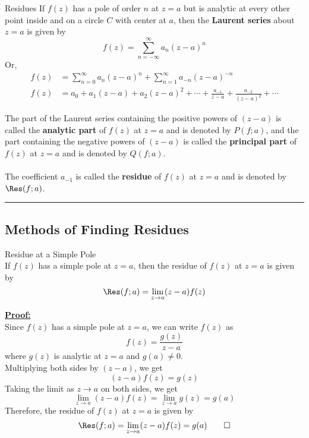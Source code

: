 \begin{definition}{Residues}{}
    If $f(z)$ has a pole of order $n$ at $z=a$ but is analytic at every other point inside and on a circle $C$ with center at $a$, then the \textbf{Laurent series} about $z=a$ is given by
    \begin{equation}
        f(z) = \sum_{n=-\infty}^{\infty} a_n (z-a)^n
    \end{equation} Or,
    \begin{align*}
        f(z) &= \sum_{n=0}^{\infty} a_n (z-a)^n + \sum_{n=1}^{\infty} a_{-n} (z-a)^{-n} \\
        f(z) &= a_0 + a_1(z-a) + a_2(z-a)^2 + \cdots + \frac{a_{-1}}{z-a} + \frac{a_{-2}}{(z-a)^2} + \cdots
    \end{align*}

    The part of the Laurent series containing the positive powers of $(z-a)$ is called the \textbf{analytic part} of $f(z)$ at $z=a$ and is denoted by $P(f;a)$, and the part containing the negative powers of $(z-a)$ is called the \textbf{principal part} of $f(z)$ at $z=a$ and is denoted by $Q(f;a)$.  \\~\\

    The coefficient $a_{-1}$ is called the \textbf{residue} of $f(z)$ at $z=a$ and is denoted by $\Res(f;a)$.
\end{definition}

\vspace{20pt}\rule{3in}{1pt}

\subsection{Methods of Finding Residues}
\begin{theorem}{Residue at a Simple Pole}{}
    \\If $f(z)$ has a simple pole at $z=a$, then the residue of $f(z)$ at $z=a$ is given by
    \[ \Res(f;a) = \lim_{z \to a} (z-a)f(z) \]
\end{theorem}

\underline{\textbf{Proof:}} \\
Since $f(z)$ has a simple pole at $z=a$, we can write $f(z)$ as
\[ f(z) = \frac{g(z)}{z-a} \]
where $g(z)$ is analytic at $z=a$ and $g(a) \neq 0$. \\
Multiplying both sides by $(z-a)$, we get
\[ (z-a)f(z) = g(z) \]
Taking the limit as $z \to a$ on both sides, we get
\[ \lim_{z \to a} (z-a)f(z) = \lim_{z \to a} g(z) = g(a) \]
Therefore, the residue of $f(z)$ at $z=a$ is given by
\[ \Res(f;a) = \lim_{z \to a} (z-a)f(z) = g(a) \qed\]


